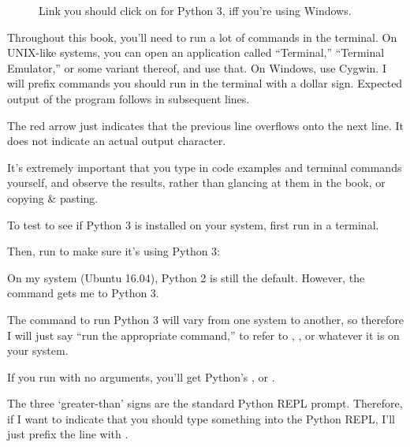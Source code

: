 \begin{figure}[ht]
  \centering
  \caption{Link you should click on for Python 3, iff you're using
    Windows.}
  \label{fig:python3-windows}
\end{figure}

Throughout this book, you'll need to run a lot of commands in the
terminal. On UNIX-like systems, you can open an application called
``Terminal,'' ``Terminal Emulator,'' or some variant thereof, and use
that. On Windows, use Cygwin. I will prefix commands you should run in
the terminal with a dollar sign. Expected output of the program
follows in subsequent lines.


\begin{remark}
  The red arrow just indicates that the previous line overflows onto
  the next line. It does not indicate an actual output character.
\end{remark}

\begin{remark}
  It's extremely important that you type in code examples and
  terminal commands yourself, and observe the results, rather than
  glancing at them in the book, or copying \& pasting.
\end{remark}

To test to see if Python 3 is installed on your system, first run
 in a terminal.


Then, run  to make sure it's using Python 3:


On my system (Ubuntu 16.04), Python 2 is still the default. However,
the command  gets me to Python 3.


The command to run Python 3 will vary from one system to another, so
therefore I will just say ``run the appropriate 
command,'' to refer to , , or whatever it
is on your system.

If you run  with no arguments, you'll get Python's
, or .


\begin{remark}
  The three `greater-than' signs are the standard Python REPL
  prompt. Therefore, if I want to indicate that you should type
  something into the Python REPL, I'll just prefix the line with
  \code{>>>}.
\end{remark}

